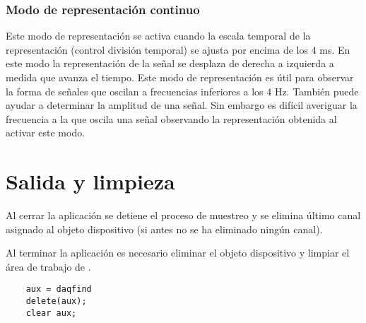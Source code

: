 \subsubsection{Modo de representación continuo}

Este modo de representación se activa cuando la escala temporal de la
representación (control división temporal) se ajusta por encima de los 4
ms. En este modo la representación de la señal se desplaza de derecha a
izquierda a medida que avanza el tiempo. Este modo de representación es
útil para observar la forma de señales que oscilan a frecuencias inferiores
a los 4 Hz. También puede ayudar a determinar la amplitud de una señal. Sin
embargo es difícil averiguar la frecuencia a la que oscila una señal
observando la representación obtenida al activar este modo.


\section{Salida y limpieza}

Al cerrar la aplicación se detiene el proceso de muestreo y se elimina
último canal asignado al objeto dispositivo (si antes no se ha eliminado
ningún canal).

Al terminar la aplicación es necesario eliminar el objeto dispositivo y
limpiar el área de trabajo de \matlab{}.

\begin{center}
    \begin{lstlisting}
	aux = daqfind
	delete(aux);
	clear aux;
    \end{lstlisting}
\end{center}
